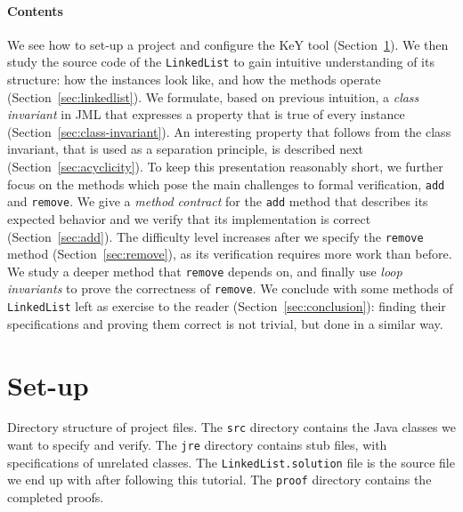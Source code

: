 \documentclass[runningheads]{llncs}
\begin{document}
\paragraph{Contents}
We see how to set-up a project and configure the KeY tool (Section~\ref{sec:setup}).
We then study the source code of the \texttt{LinkedList} to gain intuitive understanding of its structure:
how the instances look like, and how the methods operate (Section~\ref{sec:linkedlist}).
We formulate, based on previous intuition, a \emph{class invariant} in JML that expresses a property that is true of every instance (Section~\ref{sec:class-invariant}).
An interesting property that follows from the class invariant, that is used as a separation principle, is described next (Section~\ref{sec:acyclicity}).
To keep this presentation reasonably short, we further focus on the methods which pose the main challenges to formal verification, \texttt{add} and \texttt{remove}. We give a \emph{method contract} for the \texttt{add} method that describes its expected behavior and we verify that its implementation is correct (Section~\ref{sec:add}). The difficulty level increases after we specify the \texttt{remove} method (Section~\ref{sec:remove}), as its verification requires more work than before. We study a deeper method that \texttt{remove} depends on, and finally use \emph{loop invariants} to prove the correctness of \texttt{remove}.
We conclude with some methods of \texttt{LinkedList} left as exercise to the reader (Section~\ref{sec:conclusion}): finding their specifications and proving them correct is not trivial, but done in a similar way.

\section{Set-up}\label{sec:setup}

\begin{table}
\medskip
    \caption{Directory structure of project files. The \texttt{src} directory contains the Java classes we want to specify and verify. The \texttt{jre} directory contains stub files, with specifications of unrelated classes. The \texttt{LinkedList.solution} file is the source file we end up with after following this tutorial. The \texttt{proof} directory contains the completed proofs.}
    \vspace*{-20pt}
    \label{tab:directory-structure}
\end{table}
\end{document}
